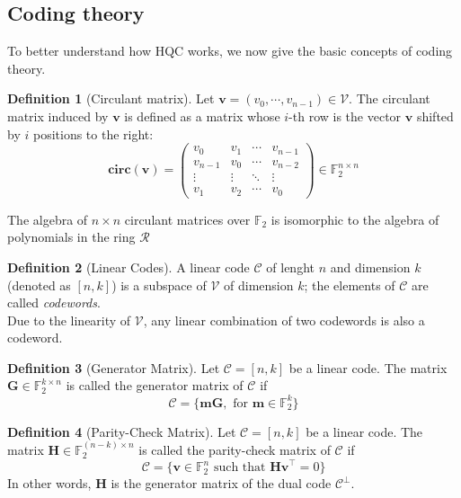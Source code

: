 \documentclass[11pt,a4paper,twocolumn]{article}
\theoremstyle{definition}
\newtheorem{definition}{Definition}[section]
\begin{document}
\subsection{Coding theory}
To better understand how HQC works, we now give the basic concepts of coding theory.
\begin{definition}[Circulant matrix]
    Let $\mathbf{v} = (v_0, \cdots, v_{n-1}) \in \mathcal{V}$. The circulant matrix induced by $\mathbf{v}$ is defined as
    a matrix whose $i$-th row is the vector $\mathbf{v}$ shifted by $i$ positions to the right:
    \begin{equation*}
        \mathbf{circ(v)} = \begin{pmatrix}
            v_0 & v_1 & \cdots & v_{n-1} \\
            v_{n-1} & v_0 & \cdots & v_{n-2} \\
            \vdots & \vdots & \ddots & \vdots \\
            v_1 & v_2 & \cdots & v_0
            \end{pmatrix} \in \mathds{F}_2^{n\times n}
    \end{equation*}
\end{definition}
The algebra of $n\times n$ circulant matrices over $\mathds{F}_2$ is isomorphic to the algebra of polynomials
in the ring $\mathcal{R}$


\begin{definition}[Linear Codes]
    A linear code $\mathcal{C}$ of lenght $n$ and dimension $k$ (denoted as $[n, k]$) is a subspace of $\mathcal{V}$ 
    of dimension $k$; the elements of $\mathcal{C}$ are called \textit{codewords}.\\
    Due to the linearity of $\mathcal{V}$, any linear combination of two codewords is also a codeword.
\end{definition}

\begin{definition}[Generator Matrix]
    Let $\mathcal{C} = [n,k]$ be a linear code. The matrix $\mathbf{G} \in \mathds{F}_2^{k\times n}$ is called the generator 
    matrix of $\mathcal{C}$ if
    \begin{equation*}
        \mathcal{C} = \{\mathbf{mG}, \text{ for } \mathbf{m}\in \mathds{F}_2^k\}
    \end{equation*}
\end{definition}

\begin{definition}[Parity-Check Matrix]
    Let $\mathcal{C} = [n,k]$ be a linear code. The matrix $\mathbf{H} \in \mathds{F}_2^{(n-k)\times n}$ is called the 
    parity-check matrix of $\mathcal{C}$ if
    \begin{equation*}
        \mathcal{C} = \{\mathbf{v} \in \mathds{F}_2^n \text{ such that } \mathbf{Hv}^\top = 0\}
    \end{equation*}
    In other words, $\mathbf{H}$ is the generator matrix of the dual code $\mathcal{C}^\perp$.
\end{definition}
\end{document}
